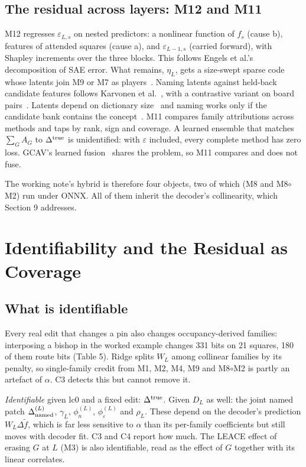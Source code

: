\documentclass[conference]{IEEEtran}
\begin{document}
\subsection{The residual across layers: M12 and M11}\label{sec:8.5}
M12 regresses $\varepsilon_{L,s}$ on nested predictors: a nonlinear function of $f_s$ (cause b), features of attended squares (cause a), and $\varepsilon_{L-1,s}$ (carried forward), with Shapley increments over the three blocks. This follows Engels et al.'s~\cite{engels2025} decomposition of SAE error. What remains, $\eta_L$, gets a size-swept sparse code whose latents join M9 or M7 as players~\cite{kulkarni2026}. Naming latents against held-back candidate features follows Karvonen et al.~\cite{karvonen2024}, with a contrastive variant on board pairs~\cite{poupart2024}. Latents depend on dictionary size~\cite{leask2025} and naming works only if the candidate bank contains the concept~\cite{shang2024}. M11 compares family attributions across methods and taps by rank, sign and coverage. A learned ensemble that matches $\sum_GA_G$ to $\Delta^{\rm true}$ is unidentified: with $\varepsilon$ included, every complete method has zero loss. GCAV's learned fusion~\cite{he2025} shares the problem, so M11 compares and does not fuse.

The working note's hybrid is therefore four objects, two of which (M8 and M8$\circ$M2) run under ONNX. All of them inherit the decoder's collinearity, which Section 9 addresses.

\section{Identifiability and the Residual as Coverage}\label{sec:9}
\subsection{What is identifiable}\label{sec:9.1}
Every real edit that changes a pin also changes occupancy-derived families: interposing a bishop in the worked example changes 331 bits on 21 squares, 180 of them route bits (Table 5). Ridge splits $W_L$ among collinear families by its penalty, so single-family credit from M1, M2, M4, M9 and M8$\circ$M2 is partly an artefact of $\alpha$. C3 detects this but cannot remove it.

\emph{Identifiable} given lc0 and a fixed edit: $\Delta^{\rm true}$. Given $D_L$ as well: the joint named patch $\Delta^{(L)}_{\rm named}$, $\gamma_L$, $\phi^{(L)}_n$, $\phi^{(L)}_\varepsilon$ and $\rho_L$. These depend on the decoder's prediction $W_L\Delta\tilde f$, which is far less sensitive to $\alpha$ than its per-family coefficients but still moves with decoder fit. C3 and C4 report how much. The LEACE effect of erasing $G$ at $L$ (M3) is also identifiable, read as the effect of $G$ together with its linear correlates.
\end{document}
